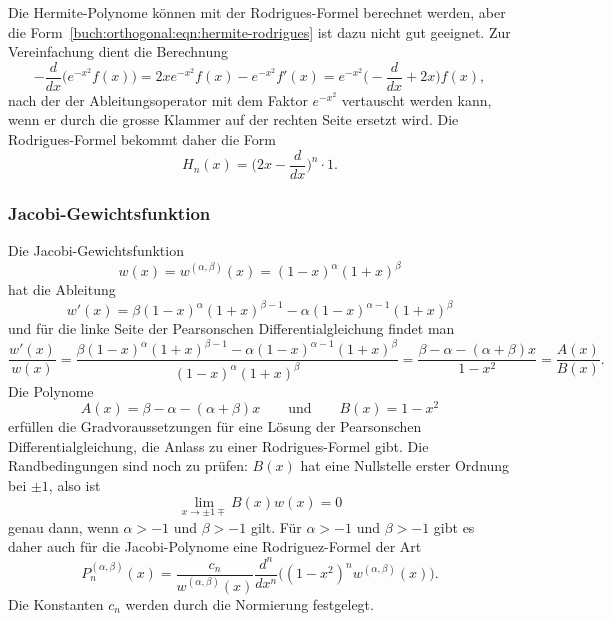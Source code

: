 Die Hermite-Polynome können mit der Rodrigues-Formel berechnet werden,
aber die Form~\eqref{buch:orthogonal:eqn:hermite-rodrigues} ist dazu
nicht gut geeignet.
Zur Vereinfachung dient die Berechnung 
\[
-\frac{d}{dx}
\bigl(
e^{-x^2}f(x)
\bigr)
=
2xe^{-x^2}f(x)
-
e^{-x^2}f'(x)
=
e^{-x^2}
\biggl(-\frac{d}{dx}+2x\biggr)
f(x),
\]
nach der der Ableitungsoperator mit dem Faktor $e^{-x^2}$ 
vertauscht werden kann, wenn er durch die grosse Klammer auf der
rechten Seite ersetzt wird.
Die Rodrigues-Formel bekommt daher die Form
\[
H_n(x) = \biggl(2x-\frac{d}{dx}\biggr)^n \cdot 1.
\]



%
%
\subsubsection{Jacobi-Gewichtsfunktion}
%
Die Jacobi-Gewichtsfunktion 
%
%
\[
w(x)
=
w^{(\alpha,\beta)}(x)
=
(1-x)^\alpha(1+x)^\beta
\]
hat die Ableitung
\[
w'(x)
=
\beta(1-x)^\alpha(1+x)^{\beta-1}-\alpha(1-x)^{\alpha-1}(1+x)^\beta
\]
und für die linke Seite der Pearsonschen Differentialgleichung findet man
\[
\frac{w'(x)}{w(x)}
=
\frac{
\beta(1-x)^\alpha(1+x)^{\beta-1}-\alpha(1-x)^{\alpha-1}(1+x)^\beta
}{
(1-x)^\alpha(1+x)^\beta
}
=
\frac{\beta-\alpha-(\alpha+\beta)x}{1-x^2}
=
\frac{A(x)}{B(x)}.
\]
Die Polynome
\[
A(x) = \beta-\alpha-(\alpha+\beta)x
\qquad\text{und}\qquad
B(x) = 1-x^2
\]
erfüllen die Gradvoraussetzungen für eine Lösung der Pearsonschen
Differentialgleichung, die Anlass zu einer Rodrigues-Formel gibt.
Die Randbedingungen sind noch zu prüfen: $B(x)$ hat eine Nullstelle
erster Ordnung bei $\pm1$, also ist
\[
\lim_{x\to \pm1\mp} B(x)w(x) = 0
\]
genau dann, wenn $\alpha>-1$ und $\beta>-1$ gilt.
Für $\alpha>-1$ und $\beta>-1$ gibt es daher auch für die Jacobi-Polynome
eine Rodriguez-Formel der Art
\[
P^{(\alpha,\beta)}_n(x)
=
\frac{c_n}{w^{(\alpha,\beta)}(x)}
\frac{d^n}{dx^n}
\bigl((1-x^2)^{n} w^{(\alpha,\beta)}(x)\bigr).
\]
Die Konstanten $c_n$ werden durch die Normierung
festgelegt.


